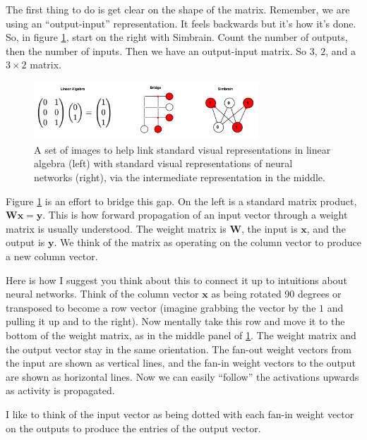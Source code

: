The first thing to do is get clear on the shape of the matrix. Remember, we are using an ``output-input'' representation.  It feels backwards but it's how it's done.  So, in figure \ref{linalgToSimbrain}, start on the right with Simbrain.  Count the number of outputs, then the number of inputs. Then we have an output-input matrix.  So $3$, $2$, and a $3 \times 2$ matrix.

\begin{figure}[h]
\centering
\includegraphics[width=0.75\textwidth]{images/LinalgToSimbrainReps.png}
\caption[Jeff Yoshimi.]{A set of images to help link standard visual representations in linear algebra (left) with standard visual representations of neural networks (right), via the intermediate representation in the middle. }
\label{linalgToSimbrain}
\end{figure}

Figure \ref{linalgToSimbrain} is an effort to bridge this gap. On the left is a standard matrix product, $\mathbf{W} \mathbf{x} = \mathbf{y}$.  This is how forward propagation of an input vector through a weight matrix is usually understood. The weight matrix is $\mathbf{W}$, the input is $\mathbf{x}$, and the output is $\mathbf{y}$. We think of the matrix as operating on the column vector to produce a new column vector.   

Here is how I suggest you think about this to connect it up to intuitions about neural networks.  Think of the column vector $\mathbf{x}$ as being rotated 90 degrees or transposed to become a row vector (imagine grabbing the vector by the $1$ and pulling it up and to the right). Now mentally take this row and move it to the bottom of the weight matrix, as in the middle panel of  \ref{linalgToSimbrain}. The weight matrix and the output vector stay in the same orientation.  The fan-out weight vectors from the input are shown as vertical lines, and the fan-in weight vectors to the output are shown as horizontal lines. Now we can easily ``follow'' the activations upwards as activity is propagated. 

I like to think of the input vector as being dotted with each fan-in weight vector on the outputs to produce the entries of the output vector.

